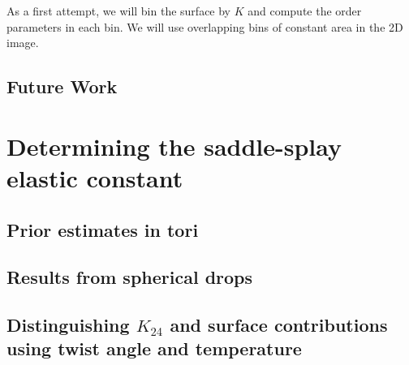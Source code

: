 As a first attempt, we will bin the surface by $K$ and compute the order parameters in each bin.
We will use overlapping bins of constant area in the 2D image. 
\subsection{Future Work}

\section{Determining the saddle-splay elastic constant}
\subsection{Prior estimates in tori}
\subsection{Results from spherical drops}
\subsection{Distinguishing $K_{24}$ and surface contributions using twist angle and temperature}
